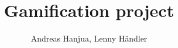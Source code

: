 \documentclass[a4paper,12pt,oneside]{book}
\begin{document}
\author{Andreas Hanjua, Lenny Händler}
\title{Gamification project}


\frontmatter
\maketitle
\tableofcontents

\mainmatter





\backmatter
\end{document}
